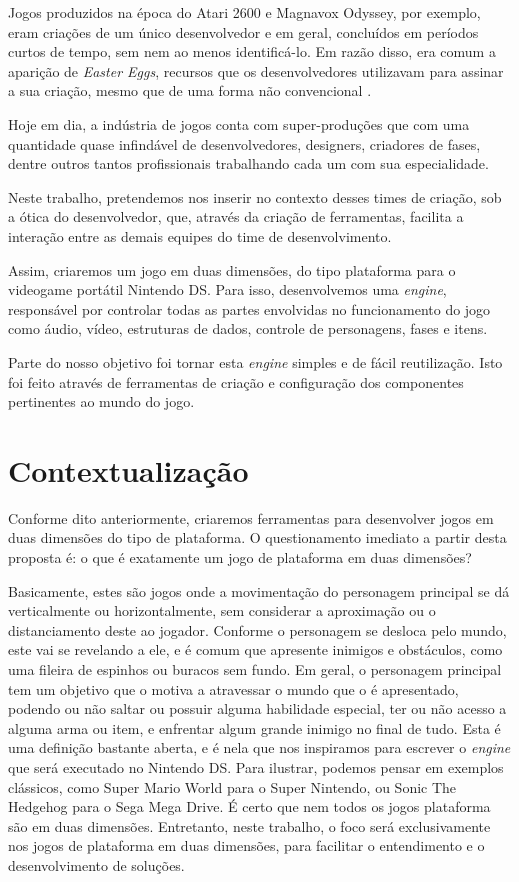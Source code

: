 \documentclass[brazil]{abnt}
\begin{document}
Jogos produzidos na época do Atari 2600 e Magnavox Odyssey, por exemplo, eram criações de um único desenvolvedor e em geral, concluídos em períodos curtos de tempo, sem nem ao menos identificá-lo. Em razão disso, era comum a aparição de \textit{Easter Eggs}, recursos que os desenvolvedores utilizavam para assinar a sua criação, mesmo que de uma forma não convencional \cite{PrimeiroDevName}.

Hoje em dia, a indústria de jogos conta com super-produções que com uma quantidade quase infindável de desenvolvedores, designers, criadores de fases, dentre outros tantos profissionais trabalhando cada um com sua especialidade.

Neste trabalho, pretendemos nos inserir no contexto desses times de criação, sob a ótica do desenvolvedor, que, através da criação de ferramentas, facilita a interação entre as demais equipes do time de desenvolvimento.

Assim, criaremos um jogo em duas dimensões, do tipo plataforma para o videogame portátil Nintendo DS. Para isso, desenvolvemos uma \textit{engine}, responsável por controlar todas as partes envolvidas no funcionamento do jogo como áudio, vídeo, estruturas de dados, controle de personagens, fases e itens.

Parte do nosso objetivo foi tornar esta \textit{engine} simples e de fácil reutilização. Isto foi feito através de ferramentas de criação e configuração dos componentes pertinentes ao mundo do jogo.


\section{Contextualização}

Conforme dito anteriormente, criaremos ferramentas para desenvolver jogos em duas dimensões do tipo de plataforma. O questionamento imediato a partir desta proposta é: o que é exatamente um jogo de plataforma em duas dimensões?

Basicamente, estes são jogos onde a movimentação do personagem principal se dá verticalmente ou horizontalmente, sem considerar a aproximação ou o distanciamento deste ao jogador. Conforme o personagem se desloca pelo mundo, este vai se revelando a ele, e é comum que apresente inimigos e obstáculos, como uma fileira de espinhos ou buracos sem fundo. Em geral, o personagem principal tem um objetivo que o motiva a atravessar o mundo que o é apresentado, podendo ou não saltar ou possuir alguma habilidade especial, ter ou não acesso a alguma arma ou item, e enfrentar algum grande inimigo no final de tudo. Esta é uma definição bastante aberta, e é nela que nos inspiramos para escrever o \textit{engine} que será executado no Nintendo DS. Para ilustrar, podemos pensar em exemplos clássicos, como Super Mario World para o Super Nintendo, ou Sonic The Hedgehog para o Sega Mega Drive. É certo que nem todos os jogos plataforma são em duas dimensões. Entretanto, neste trabalho, o foco será exclusivamente nos jogos de plataforma em duas dimensões, para facilitar o entendimento e o desenvolvimento de soluções.
\end{document}
